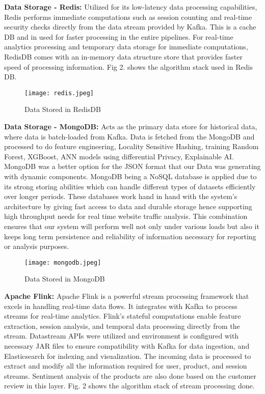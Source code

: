 \documentclass[conference]{IEEEtran}
\begin{document}
\textbf{Data Storage - Redis:} Utilized for its low-latency data processing capabilities, Redis performs immediate computations such as session counting and real-time security checks directly from the data stream provided by Kafka. This is a cache DB and in used for faster processing in the entire pipelines. For real-time analytics processing and temporary data storage for immediate computations, RedisDB comes with an in-memory data structure store that provides faster speed of processing information. Fig 2. shows the algorithm stack used in Redis DB.
\begin{figure}[htbp]
\centerline{\texttt{[image: redis.jpeg]}}
\caption{Data Stored in RedisDB}
\label{fig}
\end{figure}

\textbf{Data Storage - MongoDB:} Acts as the primary data store for historical data, where data is batch-loaded from Kafka. Data is fetched from the MongoDB and processed to do feature engineering, Locality Sensitive Hashing, training Random Forest, XGBoost, ANN models using differential Privacy, Explainable AI. MongoDB was a better option for the JSON format that our Data was generating with dynamic components. MongoDB being a NoSQL database is applied due to its strong storing abilities which can handle different types of datasets efficiently over longer periods. These databases work hand in hand with the system’s architecture by giving fast access to data and durable storage hence supporting high throughput needs for real time website traffic analysis. This combination ensures that our system will perform well not only under various loads but also it keeps long term persistence and reliability of information necessary for reporting or analysis purposes.
\begin{figure}[htbp]
\centerline{\texttt{[image: mongodb.jpeg]}}
\caption{Data Stored in MongoDB}
\label{fig}
\end{figure}


\textbf{Apache Flink:} Apache Flink is a powerful stream processing framework that excels in handling real-time data flows. It integrates with Kafka to process streams for real-time analytics. Flink’s stateful computations enable feature extraction, session analysis, and temporal data processing directly from the stream. Datastream APIs were utilized and environment is configured with necessary JAR files to ensure compatibility with Kafka for data ingestion, and Elasticsearch for indexing and visualization. The incoming data is processed to extract and modify all the information required for user, product, and session streams. Sentiment analysis of the products are also done based on the customer review in this layer. Fig. 2 shows the algorithm stack of stream processing done.
\end{document}
